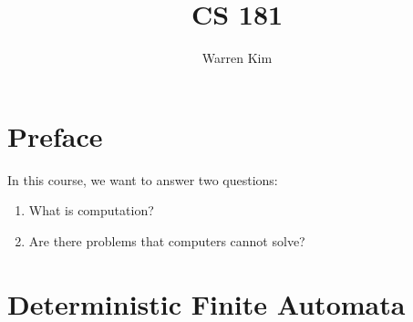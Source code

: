 \documentclass[13pt]{article}
\title{CS 181}
\author{Warren Kim}
\begin{document}
\maketitle

\newpage
\tableofcontents

\newpage
\section*{Preface}
In this course, we want to answer two questions:
\begin{enumerate}[label=(\arabic*),leftmargin=*]
\item What is computation?
\item Are there problems that computers cannot solve?
\end{enumerate}

\section{Deterministic Finite Automata}
\end{document}
